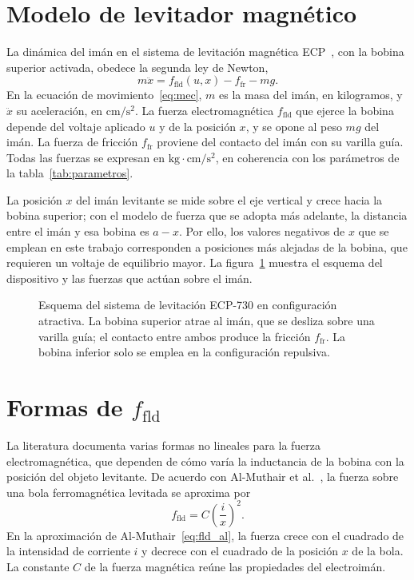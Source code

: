 \section{Modelo de levitador magnético}

La dinámica del imán en el sistema de levitación magnética ECP~\cite{730}, con la bobina superior activada, obedece la segunda ley de Newton,
\begin{equation}
m\ddot{x} = f_{\text{fld}}(u,x) - f_{\text{fr}} - mg .
\label{eq:mec}
\end{equation}
En la ecuación de movimiento~\eqref{eq:mec}, $m$ es la masa del imán, en kilogramos, y $\ddot{x}$ su aceleración, en $\text{cm}/\text{s}^2$. La fuerza electromagnética $f_{\text{fld}}$ que ejerce la bobina depende del voltaje aplicado $u$ y de la posición $x$, y se opone al peso $mg$ del imán. La fuerza de fricción $f_{\text{fr}}$ proviene del contacto del imán con su varilla guía. Todas las fuerzas se expresan en $\text{kg}\cdot\text{cm}/\text{s}^2$, en coherencia con los parámetros de la tabla~\ref{tab:parametros}.

La posición $x$ del imán levitante se mide sobre el eje vertical y crece hacia la bobina superior; con el modelo de fuerza que se adopta más adelante, la distancia entre el imán y esa bobina es $a-x$. Por ello, los valores negativos de $x$ que se emplean en este trabajo corresponden a posiciones más alejadas de la bobina, que requieren un voltaje de equilibrio mayor. La figura~\ref{fig:dispositivo} muestra el esquema del dispositivo y las fuerzas que actúan sobre el imán.

\begin{figure}[ht]
    \centering
    
    \caption[Esquema del ECP-730 en configuración atractiva]{Esquema del sistema de levitación ECP-730 en configuración atractiva. La bobina superior atrae al imán, que se desliza sobre una varilla guía; el contacto entre ambos produce la fricción $f_{\text{fr}}$. La bobina inferior solo se emplea en la configuración repulsiva.}
    \label{fig:dispositivo}
\end{figure}

\section{\texorpdfstring{Formas de $f_{\text{fld}}$}{Formas de fld}}

La literatura documenta varias formas no lineales para la fuerza electromagnética, que dependen de cómo varía la inductancia de la bobina con la posición del objeto levitante. De acuerdo con Al-Muthair et al.~\cite{al}, la fuerza sobre una bola ferromagnética levitada se aproxima por
\begin{equation}
f_{\text{fld}} = C\left(\dfrac{i}{x}\right)^2 .
\label{eq:fld_al}
\end{equation}
En la aproximación de Al-Muthair~\eqref{eq:fld_al}, la fuerza crece con el cuadrado de la intensidad de corriente $i$ y decrece con el cuadrado de la posición $x$ de la bola. La constante $C$ de la fuerza magnética reúne las propiedades del electroimán.

